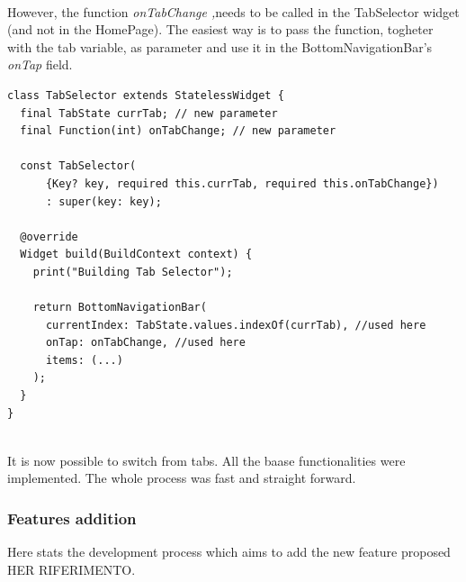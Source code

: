 \mbox{}\\
However, the function  \textit{onTabChange ,}needs to be called in the TabSelector widget (and not in the HomePage). The easiest way is to pass the function, togheter with the tab variable, as parameter and use it in the BottomNavigationBar's \textit{onTap }field.
\mbox{}\\
\begin{code}
\mbox{}
\label{code:2.31}
\begin{verbatim}
class TabSelector extends StatelessWidget {
  final TabState currTab; // new parameter
  final Function(int) onTabChange; // new parameter

  const TabSelector(
      {Key? key, required this.currTab, required this.onTabChange})
      : super(key: key);

  @override
  Widget build(BuildContext context) {
    print("Building Tab Selector");

    return BottomNavigationBar(
      currentIndex: TabState.values.indexOf(currTab), //used here
      onTap: onTabChange, //used here
      items: (...)
    );
  }
}

\end{verbatim}
\end{code}
\mbox{}\\
It is now possible to switch from tabs. All the baase functionalities were implemented. The whole process was fast and straight forward. 



\subsubsection{Features addition} 
\label{par:feature_addition_inherited_widget}
Here stats the development process which aims to add the new feature proposed HER RIFERIMENTO.

